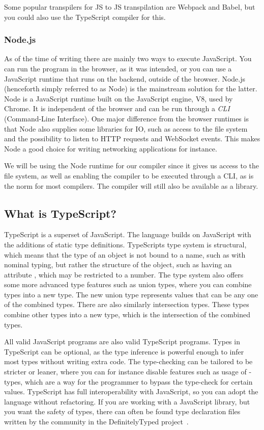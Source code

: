 Some popular transpilers for JS to JS transpilation are Webpack and Babel, but you could also use the TypeScript compiler for this.

\subsubsection{Node.js}\label{subsubsec:node}

As of the time of writing there are mainly two ways to execute JavaScript.
You can run the program in the browser, as it was intended, or you can use a JavaScript runtime that runs on the backend, outside of the browser.
Node.js (henceforth simply referred to as Node) is the mainstream solution for the latter.
Node is a JavaScript runtime built on the JavaScript engine, V8, used by Chrome.
It is independent of the browser and can be run through a \textit{CLI} (Command-Line Interface).
One major difference from the browser runtimes is that Node also supplies some libraries for IO, such as access to the file system and the possibility to listen to HTTP requests and WebSocket events.
This makes Node a good choice for writing networking applications for instance.

We will be using the Node runtime for our compiler since it gives us access to the file system, as well as enabling the compiler to be executed through a CLI, as is the norm for most compilers.
The compiler will still also be available as a library.

\subsection{What is TypeScript?}\label{subsec:what-is-typescript}

TypeScript is a superset of JavaScript.
The language builds on JavaScript with the additions of static type definitions.
TypeScripts type system is structural, which means that the type of an object is not bound to a name, such as with nominal typing, but rather the structure of the object, such as having an attribute , which may be restricted to a number.
The type system also offers some more advanced type features such as union types, where you can combine types into a new type.
The new union type represents values that can be any one of the combined types.
There are also similarly intersection types.
These types combine other types into a new type, which is the intersection of the combined types.

All valid JavaScript programs are also valid TypeScript programs.
Types in TypeScript can be optional, as the type inference is powerful enough to infer most types without writing extra code.
The type-checking can be tailored to be stricter or leaner, where you can for instance disable features such as usage of -types, which are a way for the programmer to bypass the type-check for certain values.
TypeScript has full interoperability with JavaScript, so you can adopt the language without refactoring.
If you are working with a JavaScript library, but you want the safety of types, there can often be found type declaration files written by the community in the DefinitelyTyped project~\cite{tswebsite}.

